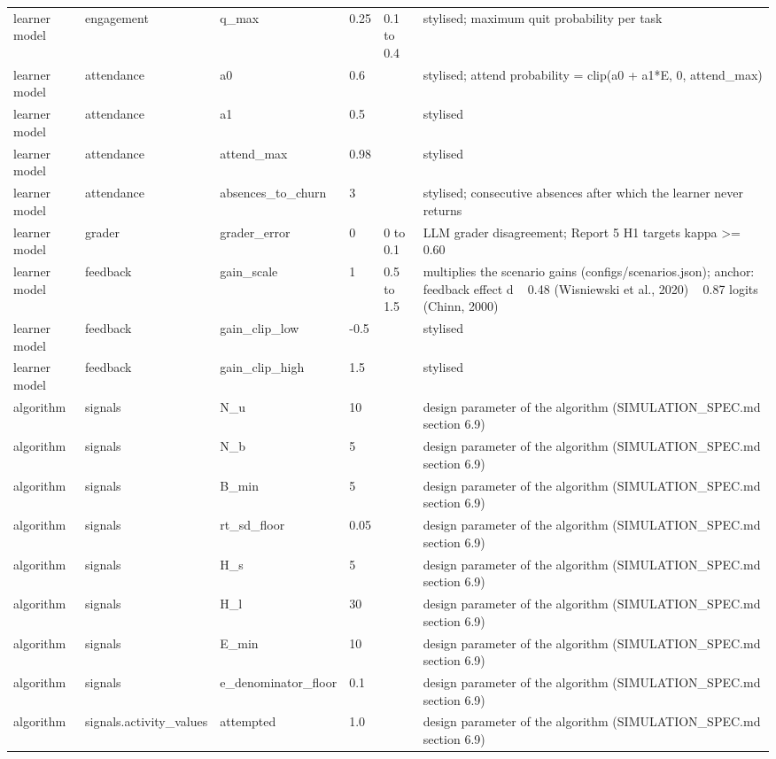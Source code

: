 \begin{table}[H]
\begin{tabular}{llllll}
learner model & engagement & q\_max & 0.25 & 0.1 to 0.4 & stylised; maximum quit probability per task \\
learner model & attendance & a0 & 0.6 &  & stylised; attend probability = clip(a0 + a1*E, 0, attend\_max) \\
learner model & attendance & a1 & 0.5 &  & stylised \\
learner model & attendance & attend\_max & 0.98 &  & stylised \\
learner model & attendance & absences\_to\_churn & 3 &  & stylised; consecutive absences after which the learner never returns \\
learner model & grader & grader\_error & 0 & 0 to 0.1 & LLM grader disagreement; Report 5 H1 targets kappa >= 0.60 \\
learner model & feedback & gain\_scale & 1 & 0.5 to 1.5 & multiplies the scenario gains (configs/scenarios.json); anchor: feedback effect d ~ 0.48 (Wisniewski et al., 2020) ~ 0.87 logits (Chinn, 2000) \\
learner model & feedback & gain\_clip\_low & -0.5 &  & stylised \\
learner model & feedback & gain\_clip\_high & 1.5 &  & stylised \\
algorithm & signals & N\_u & 10 &  & design parameter of the algorithm (SIMULATION\_SPEC.md section 6.9) \\
algorithm & signals & N\_b & 5 &  & design parameter of the algorithm (SIMULATION\_SPEC.md section 6.9) \\
algorithm & signals & B\_min & 5 &  & design parameter of the algorithm (SIMULATION\_SPEC.md section 6.9) \\
algorithm & signals & rt\_sd\_floor & 0.05 &  & design parameter of the algorithm (SIMULATION\_SPEC.md section 6.9) \\
algorithm & signals & H\_s & 5 &  & design parameter of the algorithm (SIMULATION\_SPEC.md section 6.9) \\
algorithm & signals & H\_l & 30 &  & design parameter of the algorithm (SIMULATION\_SPEC.md section 6.9) \\
algorithm & signals & E\_min & 10 &  & design parameter of the algorithm (SIMULATION\_SPEC.md section 6.9) \\
algorithm & signals & e\_denominator\_floor & 0.1 &  & design parameter of the algorithm (SIMULATION\_SPEC.md section 6.9) \\
algorithm & signals.activity\_values & attempted & 1.0 &  & design parameter of the algorithm (SIMULATION\_SPEC.md section 6.9) \\

\end{tabular}
\end{table}
